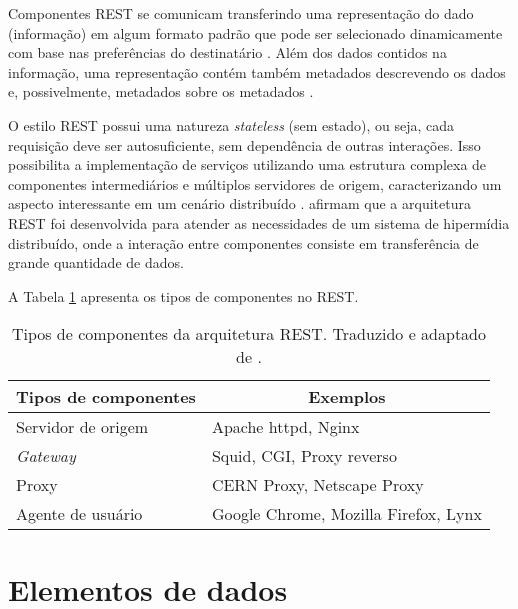    Componentes REST se comunicam transferindo uma representação do dado (informação) em algum formato padrão que pode
    ser selecionado dinamicamente com base nas preferências do destinatário \cite{fielding2002}. Além dos dados contidos na 
    informação, uma representação contém também metadados descrevendo os dados e, possivelmente, metadados sobre os
    metadados \cite{fielding2002}.
    
    O estilo REST possui uma natureza \textit{stateless} (sem estado), ou seja, cada requisição deve ser autosuficiente, sem
    dependência de outras interações. Isso possibilita a implementação de serviços utilizando uma estrutura complexa de componentes
    intermediários e múltiplos servidores de origem, caracterizando um aspecto interessante em um cenário distribuído \cite{fielding2002}.
     afirmam que a arquitetura REST foi desenvolvida para atender as necessidades de um sistema de
    hipermídia distribuído, onde a interação entre componentes consiste em transferência de grande quantidade de dados.
    
    A Tabela \ref{rest-components-elements} apresenta os tipos de componentes no REST.
  
    \begin{table}[ht!]
    \centering
    \caption{Tipos de componentes da arquitetura REST. Traduzido e adaptado de \cite{fielding2002}.}
    \label{rest-components-elements}
    \begin{tabular}{l|l}
    \hline
    \multicolumn{1}{c|}{\textbf{Tipos de componentes}} & \multicolumn{1}{c}{\textbf{Exemplos}} \\ \hline
    Servidor de origem                                  & Apache httpd, Nginx                    \\ \hline
    \textit{Gateway}                                    & Squid, CGI, Proxy reverso              \\ \hline
    Proxy                                               & CERN Proxy, Netscape Proxy             \\ \hline
    Agente de usuário                                   & Google Chrome, Mozilla Firefox, Lynx   \\ \hline
    \end{tabular}
    \end{table}
  
  \section*{Elementos de dados}
    
